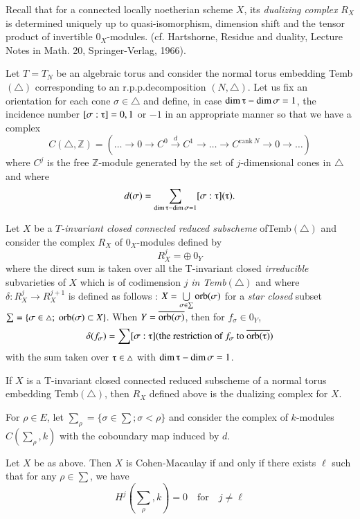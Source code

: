 Recall that for a connected locally noetherian scheme $X$, its
\textit{dualizing complex} $R_X$ is determined uniquely up to
quasi-isomorphism, dimension shift and the tensor product of
invertible $0_X$-modules. (cf. Hartshorne, Residue and duality,
Lecture Notes in Math. 20, Springer-Verlag, 1966). 

Let $T = T_N$  be an algebraic torus and consider the normal torus
embedding Temb$(\triangle)$ corresponding to an r.p.p.decomposition
$(N,\triangle)$. Let us fix an orientation for each cone $\sigma \in
\triangle$ and define, in case $\dim \tauup - \dim \sigma = 1$, the
incidence number $[\sigma : \tauup ] = 0,1$ or $-1$ in an
appropriate manner so that we have a complex 
$$
C(\triangle, \mathbb{Z}) = (\ldots \rightarrow 0 \rightarrow C^0
\overset{d}{\rightarrow} C^1 \rightarrow \ldots \rightarrow C^{\text{rank}
  ~N} \rightarrow 0 \rightarrow \ldots) 
$$
where $C^j$ is the free $\mathbb{Z}$-module generated by the set of
$j$-dimensional cones in $\triangle$ and where 
$$
d(\sigma) = \sum_{\dim \tauup -\dim \sigma = 1} [\sigma : \tauup]
(\tauup). 
$$
 
Let $X$ be a \textit{$T$-invariant closed connected reduced subscheme}
of\break Temb$(\triangle)$ and consider the complex $R_X$ of $0_X$-modules
defined by  
$$
R^j_X = \oplus~ 0_Y
$$
where the direct sum is taken over all the T-invariant closed 
\textit{irreducible} subvarieties of $X$ which is of codimension $j$
\textit{in Temb$(\triangle)$} and where $\delta : R^j_X \rightarrow
R^{j+1}_X$ is defined as follows : $X = \bigcup\limits_{\sigma \in
  \sum}\operatorname{orb} (\sigma)$ for a \textit{star closed} subset $\sum = \{
\sigma \in \triangle ;~ \operatorname{orb} (\sigma) \subset X\}$. When $Y =
\overline{\operatorname{orb}(\sigma)}$, then for $f_\sigma \in 0_Y$, 
$$
\delta (f_\sigma) = \sum[\sigma : \tauup] (\text{the restriction of }
f_\sigma \text{ to } \overline{\orb(\tauup)}) 
$$
with the sum taken over $\tauup \in \triangle$ with $\dim \tauup -
\dim \sigma = 1$.  

\begin{theorem}[(Ishida)] 
If $X$ is a T-invariant closed connected reduced subscheme of a normal
torus embedding Temb$(\triangle)$, then $R_X$ defined above is the
dualizing complex for $X$. 
\end{theorem}

For $\rho \in E$, let $\sum_\rho = \{ \sigma \in \sum ; \sigma <
\rho\}$ and consider the complex of $k$-modules $C(\sum_\rho,k)$ with
the coboundary map induced by $d$. 

\begin{corollary}[(Ishida)]
Let $X$ be as above. Then $X$ is Cohen-Macaulay if and only if there
exists $\ell$ such that for any $\rho \in \sum$, we have  
$$
H^j (\sum_\rho , k) =0 \quad \text{for} \quad  j \neq \ell
$$
\end{corollary}


